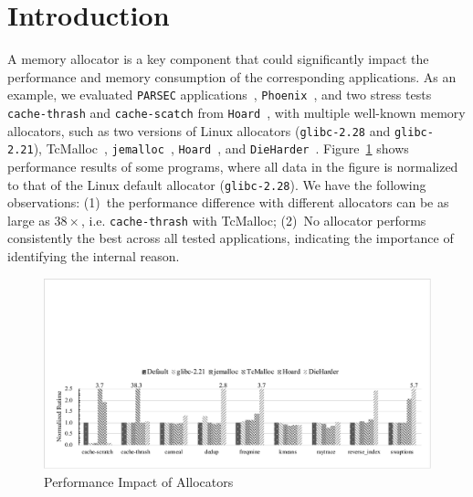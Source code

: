 

\section{Introduction}
\label{sec:intro}

A memory allocator is a key component that could significantly impact the performance and memory consumption of the corresponding applications. As an example, we evaluated \texttt{PARSEC} applications~\cite{parsec}, \texttt{Phoenix}~\cite{phoenix}, and two stress tests  \texttt{cache-thrash} and \texttt{cache-scatch} from \texttt{Hoard}~\cite{Hoard}, with multiple well-known memory allocators, such as two versions of Linux allocators (\texttt{glibc-2.28} and \texttt{glibc-2.21}), TcMalloc~\cite{tcmalloc}, \texttt{jemalloc}~\cite{jemalloc},  \texttt{Hoard}~\cite{Hoard}, and \texttt{DieHarder}~\cite{DieHarder}. Figure~\ref{fig:motivation} shows performance results of some programs, where all data in the figure is normalized to that of the Linux default allocator (\texttt{glibc-2.28}). We have the following observations: (1)~the performance difference with different allocators can be as large as $38\times$, i.e. \texttt{cache-thrash} with TcMalloc; (2)~No allocator performs consistently the best across all tested applications, indicating the importance of identifying the internal reason.

\begin{figure}[htbp]
\centering
\includegraphics[width=0.98\columnwidth]{figures/motivation}
\caption{Performance Impact of Allocators\label{fig:motivation}}
\end{figure}

